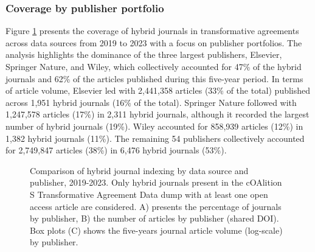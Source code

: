 \documentclass[a4paper,man,floatsintext,longtable,noextraspace,10pt]{apa6}
\begin{document}
\subsubsection{Coverage by publisher
portfolio}\label{coverage-by-publisher-portfolio}

Figure \ref{fig-upset_coverage_results_publisher} presents the coverage
of hybrid journals in transformative agreements across data sources from
2019 to 2023 with a focus on publisher portfolios. The analysis
highlights the dominance of the three largest publishers, Elsevier,
Springer Nature, and Wiley, which collectively accounted for 47\% of the
hybrid journals and 62\% of the articles published during this five-year
period. In terms of article volume, Elsevier led with 2,441,358 articles
(33\% of the total) published across 1,951 hybrid journals (16\% of the
total). Springer Nature followed with 1,247,578 articles (17\%) in 2,311
hybrid journals, although it recorded the largest number of hybrid
journals (19\%). Wiley accounted for 858,939 articles (12\%) in 1,382
hybrid journals (11\%). The remaining 54 publishers collectively
accounted for 2,749,847 articles (38\%) in 6,476 hybrid journals (53\%).

\begin{figure}[ht!]


\caption{\label{fig-upset_coverage_results_publisher}Comparison of
hybrid journal indexing by data source and publisher, 2019-2023. Only
hybrid journals present in the cOAlition S Transformative Agreement Data
dump with at least one open access article are considered. A) presents
the percentage of journals by publisher, B) the number of articles by
publisher (shared DOI). Box plots (C) shows the five-years journal
article volume (log-scale) by publisher.}

\end{figure}%
\end{document}
